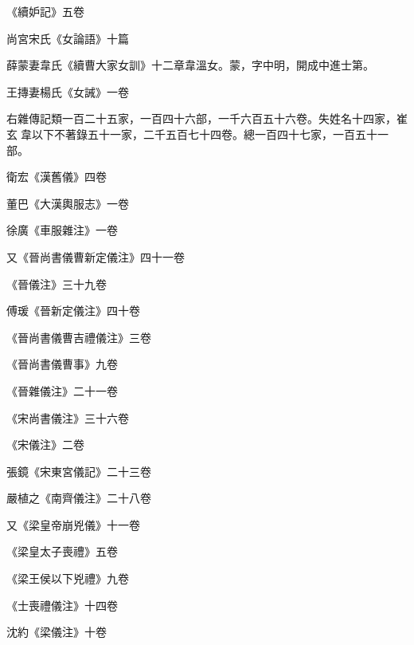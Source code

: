 \begin{pinyinscope}
 《續妒記》五卷



 尚宮宋氏《女論語》十篇



 薛蒙妻韋氏《續曹大家女訓》十二章韋溫女。蒙，字中明，開成中進士第。



 王摶妻楊氏《女誡》一卷



 右雜傳記類一百二十五家，一百四十六部，一千六百五十六卷。失姓名十四家，崔玄韋以下不著錄五十一家，二千五百七十四卷。總一百四十七家，一百五十一部。



 衛宏《漢舊儀》四卷



 董巴《大漢輿服志》一卷



 徐廣《車服雜注》一卷



 又《晉尚書儀曹新定儀注》四十一卷



 《晉儀注》三十九卷



 傅瑗《晉新定儀注》四十卷



 《晉尚書儀曹吉禮儀注》三卷



 《晉尚書儀曹事》九卷



 《晉雜儀注》二十一卷



 《宋尚書儀注》三十六卷



 《宋儀注》二卷



 張鏡《宋東宮儀記》二十三卷



 嚴植之《南齊儀注》二十八卷



 又《梁皇帝崩兇儀》十一卷



 《梁皇太子喪禮》五卷



 《梁王侯以下兇禮》九卷



 《士喪禮儀注》十四卷



 沈約《梁儀注》十卷




\end{pinyinscope}
